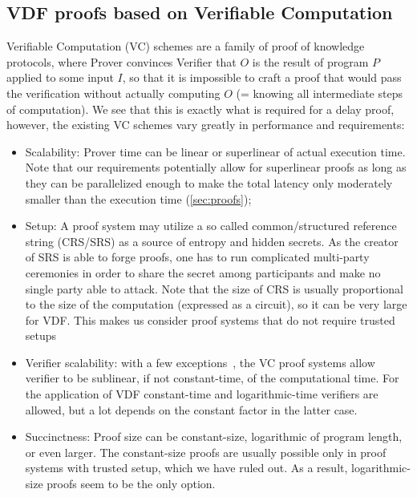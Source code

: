 \documentclass{article}
\begin{document}
\subsection{VDF proofs based on Verifiable Computation}

Verifiable Computation (VC) schemes are a family of proof of knowledge protocols, where Prover convinces Verifier that $O$ is the result of program $P$ applied to some input $I$, so that it is impossible to craft a proof that would pass the verification without actually computing $O$ (= knowing all intermediate steps of computation). We see that this is exactly what is required for a delay proof, however, the existing VC schemes vary greatly in performance and requirements:
\begin{itemize}
    \item Scalability: Prover time can be linear or superlinear of actual execution time. Note that our requirements potentially allow for superlinear proofs as long as they can be parallelized enough to make the total latency only moderately smaller than the execution time (\cref{sec:proofs});
    \item Setup: A proof system may utilize a so called common/structured reference string (CRS/SRS) as a source of entropy and hidden secrets. As the creator of SRS is able to forge proofs, one has to run complicated multi-party ceremonies in order to share the secret   among participants and make no single party able to attack. Note that the size of CRS is usually proportional to the size of the computation (expressed as a circuit), so it can be very large for VDF. This makes us consider proof systems that do not require trusted setups~\cite{DBLP:conf/ccs/AmesHIV17,DBLP:conf/sp/WahbyTSTW18,DBLP:conf/sp/BunzBBPWM18,DBLP:conf/crypto/Ben-SassonBHR19} 
    \item Verifier scalability: with a few exceptions~\cite{DBLP:conf/sp/BunzBBPWM18}, the VC proof systems allow verifier to be sublinear, if not constant-time, of the computational time. For the application of VDF constant-time and logarithmic-time verifiers are allowed, but a lot depends on the constant factor in the latter case.
    \item Succinctness: Proof size can be constant-size, logarithmic of program length, or even larger. The constant-size proofs are usually possible only in proof systems with trusted setup, which we have ruled out. As a result, logarithmic-size proofs seem to be the only option. 
\end{itemize}
\end{document}
